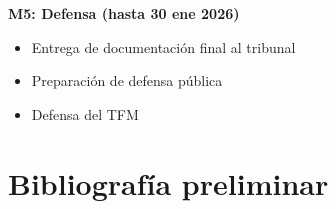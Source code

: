 \documentclass[12pt,a4paper]{article}
\begin{document}
\textbf{M5: Defensa (hasta 30 ene 2026)}
\begin{itemize}
    \item Entrega de documentación final al tribunal
    \item Preparación de defensa pública
    \item Defensa del TFM
\end{itemize}

\section{Bibliografía preliminar}

\nocite{*}


\end{document}
